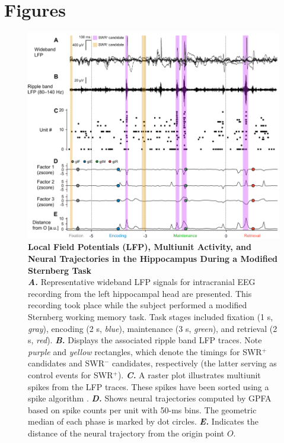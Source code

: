 \documentclass[final,3p,times,twocolumn]{elsarticle}
\begin{document}
\section*{Figures}
\label{figures}
        \clearpage
        \begin{figure}[ht]
        	\centering
            \includegraphics[width=1\textwidth]{./src/figures/.png/Figure_ID_01.png}
        	\caption{\textbf{
Local Field Potentials (LFP), Multiunit Activity, and Neural Trajectories in the Hippocampus During a Modified Sternberg Task
}
\smallskip
\\
\textbf{\textit{A.}} Representative wideband LFP signals for intracranial EEG recording from the left hippocampal head are presented. This recording took place while the subject performed a modified Sternberg working memory task. Task stages included fixation (1 s, \textit{gray}), encoding (2 s, \textit{blue}), maintenance (3 s, \textit{green}), and retrieval (2 s, \textit{red}). \textbf{\textit{B.}} Displays the associated ripple band LFP traces. Note \textit{purple} and \textit{yellow} rectangles, which denote the timings for SWR$^+$ candidates and SWR$^-$ candidates, respectively (the latter serving as control events for SWR$^+$). \textbf{\textit{C.}} A raster plot illustrates multiunit spikes from the LFP traces. These spikes have been sorted using a spike algorithm \cite{niediek_reliable_2016}. \textbf{\textit{D.}} Shows neural trajectories computed by GPFA\cite{yu_gaussian-process_2009} based on spike counts per unit with 50-ms bins. The geometric median of each phase is marked by dot circles. \textbf{\textit{E.}} Indicates the distance of the neural trajectory from the origin point $O$.
}
        	\label{fig:01}
        \end{figure}
\end{document}
